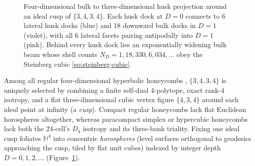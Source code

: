 \begin{figure}[tb]
\caption{Four-dimensional bulk to three-dimensional husk projection around an ideal cusp of $\{3,4,3,4\}$. Each husk
dock at $D = 0$ connects to 6 lateral husk docks (blue) and 18 downward bulk docks in $D = 1$ (violet), with all 6
lateral facets pairing antipodally into $D = 1$ (pink). Behind every husk dock lies an exponentially widening bulk beam
whose shell counts $N_D = 1, 18, 330, 6{,}034, \dots$ obey the Steinberg cubic \eqref{eq:steinberg-cubic}.}
\label{fig:cusp-projection}
\end{figure}

Among all regular four-dimensional hyperbolic honeycombs \cite{coxeter1956}, $\{3,4,3,4\}$ is uniquely selected by
combining a finite self-dual 4-polytope, exact rank-4 isotropy, and a flat three-dimensional cubic vertex figure
$\{4,3,4\}$ around each ideal point at infinity (a \emph{cusp}). Compact regular honeycombs lack flat Euclidean
horospheres altogether, whereas paracompact simplex or hypercubic honeycombs lack both the 24-cell's $D_4$ isotropy and
its three-bank triality. Fixing one ideal cusp foliates $\mathbb{H}^4$ into concentric \emph{horospheres} (level
surfaces orthogonal to geodesics approaching the cusp, tiled by flat unit cubes) indexed by integer depth
$D = 0, 1, 2, \dots$ (Figure~\ref{fig:cusp-projection}).

